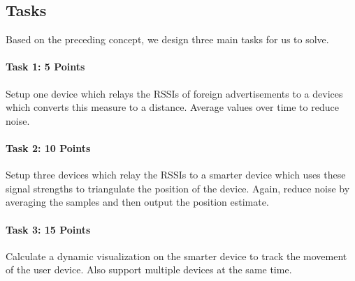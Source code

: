 \subsection{Tasks}
Based on the preceding concept, we design three main tasks for us to solve.

\paragraph{Task 1: 5 Points}
Setup one device which relays the RSSIs of foreign advertisements to a devices which converts this measure to a distance.
Average values over time to reduce noise.

\paragraph{Task 2: 10 Points}
Setup three devices which relay the RSSIs to a smarter device which uses these signal strengths to triangulate the position of the device.
Again, reduce noise by averaging the samples and then output the position estimate.

\paragraph{Task 3: 15 Points}
Calculate a dynamic visualization on the smarter device to track the movement of the user device.
Also support multiple devices at the same time.

